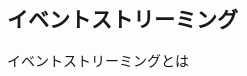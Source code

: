 \documentclass[../../../main]{subfiles}
\begin{document}
    \subsection{イベントストリーミング}\label{subsec:phraseology-event_streaming}

    イベントストリーミングとは
\end{document}
